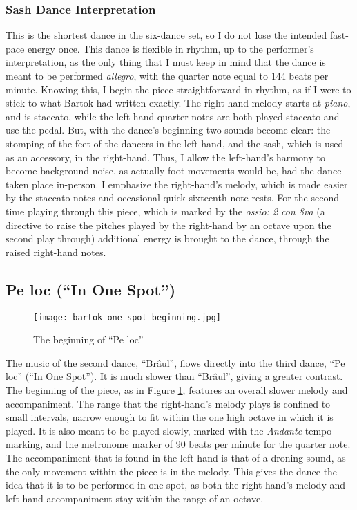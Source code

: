 \subsubsection{Sash Dance Interpretation}

This is the shortest dance in the six-dance set, so I do not lose the intended fast-pace energy once. This dance is flexible in rhythm, up to the performer's interpretation, as the only thing that I must keep in mind that the dance is meant to be performed \textit{allegro}, with the quarter note equal to 144 beats per minute. Knowing this, I begin the piece straightforward in rhythm, as if I were to stick to what Bartok had written exactly. The right-hand melody starts at \textit{piano}, and is staccato, while the left-hand quarter notes are both played staccato and use the pedal. But, with the dance's beginning two sounds become clear: the stomping of the feet of the dancers in the left-hand, and the sash, which is used as an accessory, in the right-hand. Thus, I allow the left-hand's harmony to become background noise, as actually foot movements would be, had the dance taken place in-person. I emphasize the right-hand's melody, which is made easier by the staccato notes and occasional quick sixteenth note rests. For the second time playing through this piece, which is marked by the \textit{ossio: 2 con 8va} (a directive to raise the pitches played by the right-hand by an octave upon the second play through) additional energy is brought to the dance, through the raised right-hand notes. 

\subsection{Pe loc (``In One Spot'')}

\begin{figure}
  \centering
  \texttt{[image: bartok-one-spot-beginning.jpg]}
  \caption[The beginning of ``Pe loc'', in Bartok's \textit{Six Romanian Folk Dances}, Sz. 56, BB 68]{The beginning of ``Pe loc''}  
  \label{fig:bartok-one-spot-beginning}
\end{figure}

The music of the second dance, ``Brâul'', flows directly into the third dance, ``Pe loc'' (``In One Spot''). It is much slower than ``Brâul'', giving a greater contrast. The beginning of the piece, as in Figure \ref{fig:bartok-one-spot-beginning}\autocite{Lung_2016}, features an overall slower melody and accompaniment. The range that the right-hand's melody plays is confined to small intervals, narrow enough to fit within the one high octave in which it is played. It is also meant to be played slowly, marked with the \textit{Andante} tempo marking, and the metronome marker of 90 beats per minute for the quarter note. The accompaniment that is found in the left-hand is that of a droning sound, as the only movement within the piece is in the melody. This gives the dance the idea that it is to be performed in one spot, as both the right-hand's melody and left-hand accompaniment stay within the range of an octave.


